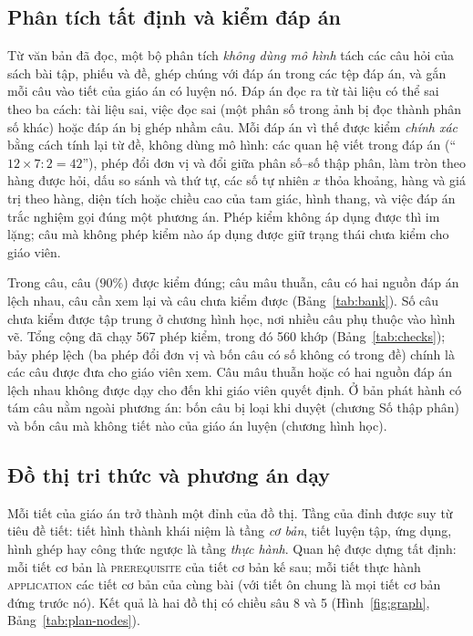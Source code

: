 \subsection{Phân tích tất định và kiểm đáp án}\label{sec:bank}
Từ văn bản đã đọc, một bộ phân tích \emph{không dùng mô hình} tách các câu hỏi của sách bài tập, phiếu và đề, ghép chúng với đáp án trong các tệp đáp án, và gắn mỗi câu vào tiết của giáo án có luyện nó. Đáp án đọc ra từ tài liệu có thể sai theo ba cách: tài liệu sai, việc đọc sai (một phân số trong ảnh bị đọc thành phân số khác) hoặc đáp án bị ghép nhầm câu. Mỗi đáp án vì thế được kiểm \emph{chính xác} bằng cách tính lại từ đề, không dùng mô hình: các quan hệ viết trong đáp án (``$12\times 7:2=42$''), phép đổi đơn vị và đổi giữa phân số--số thập phân, làm tròn theo hàng được hỏi, dấu so sánh và thứ tự, các số tự nhiên $x$ thỏa khoảng, hàng và giá trị theo hàng, diện tích hoặc chiều cao của tam giác, hình thang, và việc đáp án trắc nghiệm gọi đúng một phương án. Phép kiểm không áp dụng được thì im lặng; câu mà không phép kiểm nào áp dụng được giữ trạng thái chưa kiểm cho giáo viên.

Trong \NItems{} câu, \NVerified{} câu ($90\%$) được kiểm đúng; \NConflict{} câu mâu thuẫn, \NDisputedItems{} câu có hai nguồn đáp án lệch nhau, \NReviewItems{} câu cần xem lại và \NUnchecked{} câu chưa kiểm được (Bảng~\ref{tab:bank}). Số câu chưa kiểm được tập trung ở chương hình học, nơi nhiều câu phụ thuộc vào hình vẽ. Tổng cộng đã chạy 567 phép kiểm, trong đó 560 khớp (Bảng~\ref{tab:checks}); bảy phép lệch (ba phép đổi đơn vị và bốn câu có số không có trong đề) chính là các câu được đưa cho giáo viên xem. Câu mâu thuẫn hoặc có hai nguồn đáp án lệch nhau không được dạy cho đến khi giáo viên quyết định. Ở bản phát hành có tám câu nằm ngoài phương án: bốn câu bị loại khi duyệt (chương Số thập phân) và bốn câu mà không tiết nào của giáo án luyện (chương hình học).

\begin{table}[tbp]
\centering
\caption{Ngân hàng câu hỏi và kết quả kiểm đáp án.}
\label{tab:bank}

\end{table}

\begin{table}[tbp]
\centering
\caption{Các phép kiểm chính xác đã chạy trên đáp án (``lệch'': kết quả của phép kiểm không khớp với đáp án của tài liệu).}
\label{tab:checks}

\end{table}

\subsection{Đồ thị tri thức và phương án dạy}\label{sec:plan}
Mỗi tiết của giáo án trở thành một đỉnh của đồ thị. Tầng của đỉnh được suy từ tiêu đề tiết: tiết hình thành khái niệm là tầng \emph{cơ bản}, tiết luyện tập, ứng dụng, hình ghép hay công thức ngược là tầng \emph{thực hành}. Quan hệ được dựng tất định: mỗi tiết cơ bản là \textsc{prerequisite} của tiết cơ bản kế sau; mỗi tiết thực hành \textsc{application} các tiết cơ bản của cùng bài (với tiết ôn chung là mọi tiết cơ bản đứng trước nó). Kết quả là hai đồ thị có chiều sâu 8 và 5 (Hình~\ref{fig:graph}, Bảng~\ref{tab:plan-nodes}).

